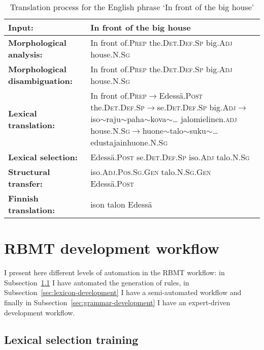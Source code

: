 \documentclass[11pt,a4paper]{article}
\begin{document}
\begin{table*}
\begin{center}
    \begin{tabular}{lp{}}
\toprule
\bf Input: & In front of the big house \\
\midrule
\bf Morphological analysis: & In front of.\textsc{Prep} the.\textsc{Det.Def.Sp}
big.\textsc{Adj} house.\textsc{N.Sg}
\\
\midrule
\bf Morphological disambiguation: &
In front of.\textsc{Prep} the.\textsc{Det.Def.Sp}
big.\textsc{Adj} house.\textsc{N.Sg}
\\
\midrule
\bf Lexical translation: &
In front of.\textsc{Prep}$\rightarrow$Edess\"a.\textsc{Post}
the.\textsc{Det.Def.Sp}$\rightarrow$se.\textsc{Det.Def.Sp}
big.\textsc{Adj}$\rightarrow$iso$\sim$raju$\sim$paha$\sim$kova$\sim$\ldots
jalomielinen.\textsc{adj}
house.\textsc{N.Sg}$\rightarrow$huone$\sim$talo$\sim$suku$\sim$\ldots
edustajainhuone.\textsc{N.Sg}
\\
\midrule
\bf Lexical selection: & Edess\"a.\textsc{Post}  se.\textsc{Det.Def.Sp} iso.\textsc{Adj} talo.\textsc{N.Sg}
\\
\midrule
\bf Structural transfer: & iso.\textsc{Adj.Pos.Sg.Gen} talo.\textsc{N.Sg.Gen}
Edess\"a.\textsc{Post}
\\
\midrule
\bf Finnish translation: & ison talon Edess\"a \\
\bottomrule
\end{tabular}
\caption{Translation process for the English phrase `In front of the big house'\\
\label{table:translation}
    }
\end{center}
\end{table*}

\section{RBMT development workflow}
\label{sec:training}

I present here different levels of automation in the RBMT workflow: in
Subsection~\ref{sec:lexical-selection} I have automated the generation of
rules, in Subsection~\ref{sec:lexicon-development} I have a semi-automated
workflow and finally in Subsection~\ref{sec:grammar-development} I have
an expert-driven development workflow.

\subsection{Lexical selection training}
\label{sec:lexical-selection}
\end{document}
